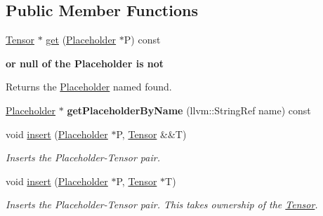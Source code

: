 \subsection*{Public Member Functions}
\begin{DoxyCompactItemize}
\item 
\hyperlink{classglow_1_1_tensor}{Tensor} $\ast$ \hyperlink{classglow_1_1_placeholder_bindings_a98bdcb9a47a36f8dce6d0f2d86a0080c}{get} (\hyperlink{classglow_1_1_placeholder}{Placeholder} $\ast$P) const
\end{DoxyCompactItemize}
\begin{Indent}\textbf{ or null of the Placeholder is not}\par
{\em \begin{DoxyReturn}{Returns}
the \hyperlink{classglow_1_1_placeholder}{Placeholder} named found. 
\end{DoxyReturn}
}\begin{DoxyCompactItemize}
\item 
\mbox{\label{classglow_1_1_placeholder_bindings_a6aea74bf3119ead471f251110900d2d6}} 
\hyperlink{classglow_1_1_placeholder}{Placeholder} $\ast$ {\bfseries get\+Placeholder\+By\+Name} (llvm\+::\+String\+Ref name) const
\item 
\mbox{\label{classglow_1_1_placeholder_bindings_a6232665aca76609836c22fbf7485c7ca}} 
void \hyperlink{classglow_1_1_placeholder_bindings_a6232665aca76609836c22fbf7485c7ca}{insert} (\hyperlink{classglow_1_1_placeholder}{Placeholder} $\ast$P, \hyperlink{classglow_1_1_tensor}{Tensor} \&\&T)
\begin{DoxyCompactList}\small\item\em Inserts the Placeholder-\/\+Tensor pair. \end{DoxyCompactList}\item 
\mbox{\label{classglow_1_1_placeholder_bindings_a53d62844619653f2e11ec1724fa8ee8f}} 
void \hyperlink{classglow_1_1_placeholder_bindings_a53d62844619653f2e11ec1724fa8ee8f}{insert} (\hyperlink{classglow_1_1_placeholder}{Placeholder} $\ast$P, \hyperlink{classglow_1_1_tensor}{Tensor} $\ast$T)
\begin{DoxyCompactList}\small\item\em Inserts the Placeholder-\/\+Tensor pair. This takes ownership of the \hyperlink{classglow_1_1_tensor}{Tensor}. \end{DoxyCompactList}\item 

\end{DoxyCompactItemize}
\end{Indent}
